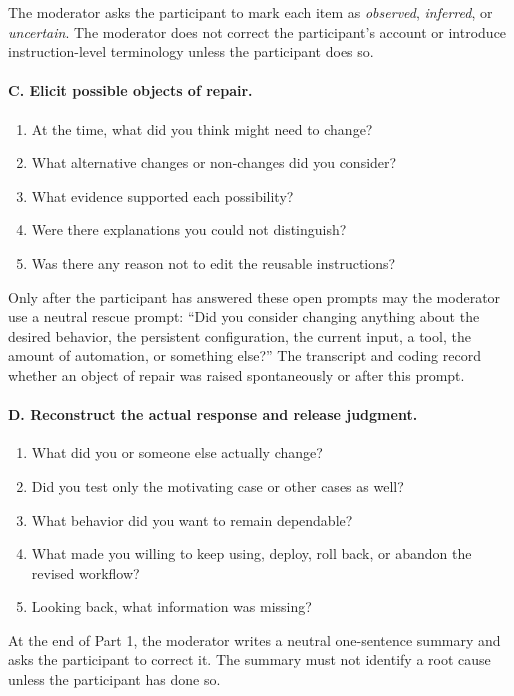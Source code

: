 The moderator asks the participant to mark each item as \emph{observed},
\emph{inferred}, or \emph{uncertain}. The moderator does not correct the
participant's account or introduce instruction-level terminology unless the
participant does so.

\paragraph{C. Elicit possible objects of repair.}
\begin{enumerate}[leftmargin=*]
    \item At the time, what did you think might need to change?
    \item What alternative changes or non-changes did you consider?
    \item What evidence supported each possibility?
    \item Were there explanations you could not distinguish?
    \item Was there any reason not to edit the reusable instructions?
\end{enumerate}
Only after the participant has answered these open prompts may the moderator use
a neutral rescue prompt: ``Did you consider changing anything about the desired
behavior, the persistent configuration, the current input, a tool, the amount
of automation, or something else?'' The transcript and coding record whether
an object of repair was raised spontaneously or after this prompt.

\paragraph{D. Reconstruct the actual response and release judgment.}
\begin{enumerate}[leftmargin=*]
    \item What did you or someone else actually change?
    \item Did you test only the motivating case or other cases as well?
    \item What behavior did you want to remain dependable?
    \item What made you willing to keep using, deploy, roll back, or abandon the
    revised workflow?
    \item Looking back, what information was missing?
\end{enumerate}

At the end of Part 1, the moderator writes a neutral one-sentence summary and
asks the participant to correct it. The summary must not identify a root cause
unless the participant has done so.

